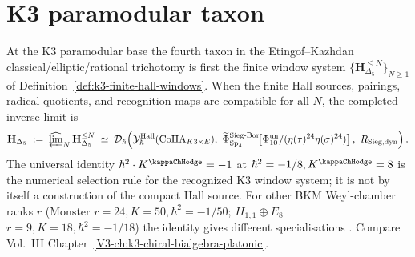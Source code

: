 \section{K3 paramodular taxon}
\label{sec:ucqg-supplement}

\begin{remark}
\label{rem:ucqg-1}
At the K3 paramodular base the fourth taxon in the
Etingof--Kazhdan classical/elliptic/rational trichotomy is first the
finite window system
$\{\mathbf H_{\Delta_5}^{\le N}\}_{N\ge1}$ of
Definition~\ref{def:k3-finite-hall-windows}.  When the finite Hall
sources, pairings, radical quotients, and recognition maps are
compatible for all $N$, the completed inverse limit is
\[
 \mathbf H_{\Delta_5}
 \;:=\;
 \widehat{\varprojlim}_{N}\,\mathbf H_{\Delta_5}^{\le N}
 \;\simeq\;
 \mathcal D_\hbar\!\left(
 \mathcal Y^{\mathrm{Hall}}_\hbar(\operatorname{CoHA}_{K3\times E}),\
 \widetilde\Phi^{\mathrm{Sieg\text{-}Bor}}_{\mathrm{Sp}_4}\!\!
 \left[\Phi_{10}^{\mathrm{un}}/(\eta(\tau)^{24}\eta(\sigma)^{24})\right],\
 R_{\mathrm{Sieg,dyn}}
 \right).
\]
The universal identity $\hbar^2\cdot K^{\kappaChHodge} = -1$ at
$\hbar^2 = -1/8, K^{\kappaChHodge} = 8$ is the numerical
selection rule for the recognized K3 window system; it is not by
itself a construction of the compact Hall source.  For other BKM
Weyl-chamber ranks $r$ (Monster $r=24, K=50, \hbar^2=-1/50$;
$II_{1,1}\oplus E_8$ $r=9, K=18, \hbar^2=-1/18$) the identity gives
different specialisations
\cite{EtingofKazhdan2007PartV,Borcherds1998,PasolZagier2013}.
Compare Vol.~III Chapter~\ref{V3-ch:k3-chiral-bialgebra-platonic}.
\end{remark}
